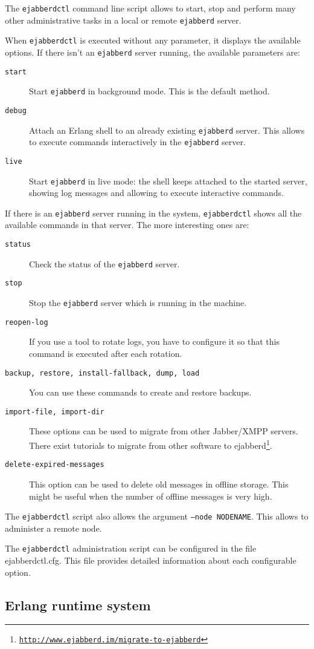 \documentclass[a4paper,10pt]{book}
\newcommand{\ind}[1]{\begin{latexonly}\index{#1}\end{latexonly}}
\newcommand{\bracehack}{\def\{{\char"7B}\def\}{\char"7D}}
\newcommand{\titem}[1]{\item[\bracehack\texttt{#1}]}
\newcommand{\term}[1]{\texttt{#1}}
\newcommand{\ejabberd}{\texttt{ejabberd}}
\newcommand{\Jabber}{Jabber}
\gdef\footahref#1#2{#2\footnote{\href{#1}{\texttt{#1}}}}
\begin{document}
The \term{ejabberdctl} command line script allows to start, stop and perform 
many other administrative tasks in a local or remote \ejabberd{} server.

When \term{ejabberdctl} is executed without any parameter,
it displays the available options. If there isn't an \ejabberd{} server running, 
the available parameters are:
\begin{description}
\titem{start} Start \ejabberd{} in background mode. This is the default method.
\titem{debug} Attach an Erlang shell to an already existing \ejabberd{} server. This allows to execute commands interactively in the \ejabberd{} server.
\titem{live} Start \ejabberd{} in live mode: the shell keeps attached to the started server, showing log messages and allowing to execute interactive commands.
\end{description}

If there is an \ejabberd{} server running in the system,
\term{ejabberdctl} shows all the available commands in that server.
The more interesting ones are:
\begin{description}
\titem{status} Check the status of the \ejabberd{} server.
\titem{stop} Stop the \ejabberd{} server which is running in the machine.
\titem{reopen-log} If you use a tool to rotate logs, you have to configure it
  so that this command is executed after each rotation.
\titem {backup, restore, install-fallback, dump, load} You can use these
  commands to create and restore backups. 
\titem{import-file, import-dir} \ind{migration from other software}
  These options can be used to migrate from other \Jabber{}/XMPP servers. There
  exist tutorials to \footahref{http://www.ejabberd.im/migrate-to-ejabberd}{migrate from other software to ejabberd}.
\titem{delete-expired-messages} This option can be used to delete old messages
  in offline storage. This might be useful when the number of offline messages
  is very high.
\end{description}

The \term{ejabberdctl} script also allows the argument \term{--node NODENAME}.
This allows to administer a remote node.

The \term{ejabberdctl} administration script can be configured in the file ejabberdctl.cfg.
This file provides detailed information about each configurable option.


\subsection{Erlang runtime system}
\label{erlangconfiguration}
\end{document}
